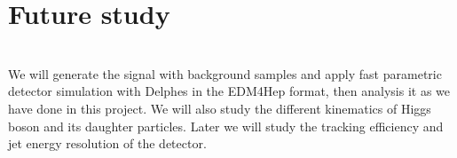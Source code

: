 \chapter{Future study}

\setcounter{equation}{0}
\setcounter{table}{0}
\setcounter{figure}{0}
\baselineskip 24pt
\hspace{10pt}
\\

We will generate the signal with background samples and apply fast parametric detector simulation with Delphes in the EDM4Hep format, then  analysis it as we have done in this project. We will also study the different kinematics of Higgs boson and its daughter particles. Later we will study the tracking efficiency  and jet energy resolution of the detector.